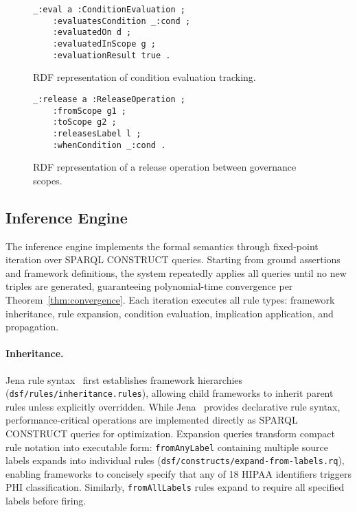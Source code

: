 \documentclass{IOS-Book-Article}
\begin{document}
\begin{figure}[ht]
\begin{lstlisting}[basicstyle=\ttfamily, frame=none]
_:eval a :ConditionEvaluation ;
    :evaluatesCondition _:cond ;
    :evaluatedOn d ;
    :evaluatedInScope g ;
    :evaluationResult true .
\end{lstlisting}
\caption{RDF representation of condition evaluation tracking.}
\label{fig:appendix-condition-eval}
\end{figure}

\begin{figure}[ht]
\begin{lstlisting}[basicstyle=\ttfamily, frame=none]
_:release a :ReleaseOperation ;
    :fromScope g1 ;
    :toScope g2 ;
    :releasesLabel l ;
    :whenCondition _:cond .
\end{lstlisting}
\caption{RDF representation of a release operation between governance scopes.}
\label{fig:appendix-release-op}
\end{figure}

\subsection{Inference Engine}\label{sec:appendix-inference}

The inference engine implements the formal semantics through fixed-point iteration over SPARQL CONSTRUCT queries. Starting from ground assertions and framework definitions, the system repeatedly applies all queries until no new triples are generated, guaranteeing polynomial-time convergence per Theorem~\ref{thm:convergence}. Each iteration executes all rule types: framework inheritance, rule expansion, condition evaluation, implication application, and propagation.

\paragraph{Inheritance.}
Jena rule syntax~\cite{jena} first establishes framework hierarchies (\texttt{dsf/rules/inheritance.rules}), allowing child frameworks to inherit parent rules unless explicitly overridden. While Jena~\cite{jena} provides declarative rule syntax, performance-critical operations are implemented directly as SPARQL CONSTRUCT queries for optimization. Expansion queries transform compact rule notation into executable form: \texttt{fromAnyLabel} containing multiple source labels expands into individual rules (\texttt{dsf/constructs/expand-from-labels.rq}), enabling frameworks to concisely specify that any of 18 HIPAA identifiers triggers PHI classification. Similarly, \texttt{fromAllLabels} rules expand to require all specified labels before firing.
\end{document}
